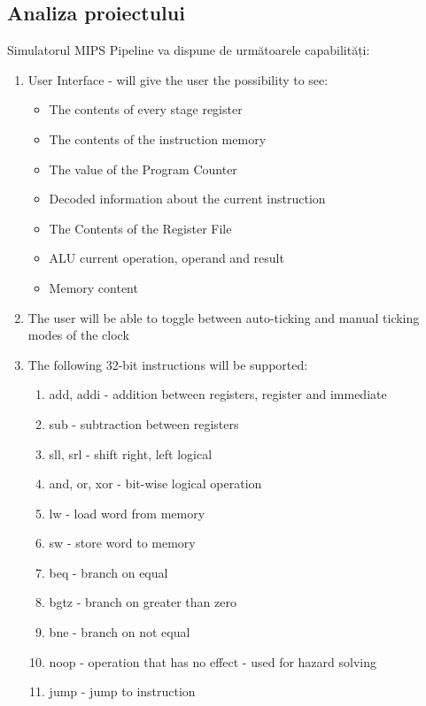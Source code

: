\documentclass{article}
\begin{document}
\subsection{Analiza proiectului}
Simulatorul MIPS Pipeline va dispune de următoarele capabilități:
\begin{enumerate}
    \item User Interface - will give the user the possibility to see:
    \begin{itemize}
        \item The contents of every stage register
        \item The contents of the instruction memory
        \item The value of the Program Counter
        \item Decoded information about the current instruction
        \item The Contents of the Register File
        \item ALU current operation, operand and result
        \item Memory content
    \end{itemize}
    \item The user will be able to toggle between auto-ticking and manual ticking modes of the clock
    \item The following 32-bit instructions will be supported:
    \begin{enumerate}
        \item add, addi - addition between registers, register and immediate
        \item sub - subtraction between registers
        \item sll, srl - shift right, left logical
        \item and, or, xor - bit-wise logical operation
        \item lw - load word from memory
        \item sw - store word to memory
        \item beq - branch on equal
        \item bgtz - branch on greater than zero
        \item bne - branch on not equal
        \item noop - operation that has no effect - used for hazard solving
        \item jump - jump to instruction
    \end{enumerate}
\end{enumerate}
\end{document}
